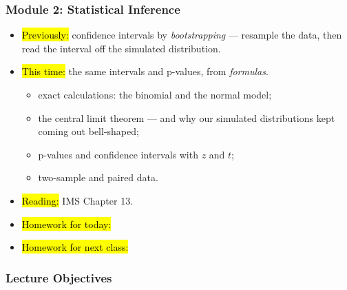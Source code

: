 

\begin{frame}
\frametitle{Module 2: Statistical Inference}
    \begin{itemize}
        \item \hl{Previously:} confidence intervals by \emph{bootstrapping} --- resample the data, then read the interval off the simulated distribution.
        \item \hl{This time:} the same intervals and p-values, from \emph{formulas}.
          \begin{itemize}
              \item exact calculations: the binomial and the normal model;
              \item the central limit theorem --- and why our simulated distributions kept coming out bell-shaped;
              \item p-values and confidence intervals with $z$ and $t$;
              \item two-sample and paired data.
          \end{itemize}
        \item \hl{Reading:} IMS Chapter 13.
        \item \hl{Homework for today:}
        \item \hl{Homework for next class:}
    \end{itemize}
\end{frame}


\begin{frame}
    \frametitle{Lecture Objectives}
\end{frame}
